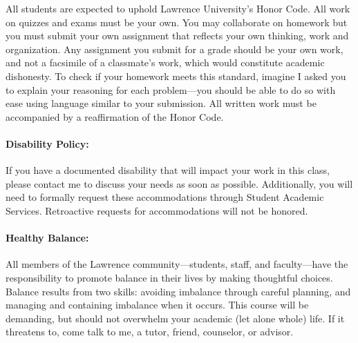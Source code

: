\documentclass[11pt,]{article}
\begin{document}
All students are expected to uphold Lawrence University's Honor Code.
All work on quizzes and exams must be your own. You may collaborate on
homework but you must submit your own assignment that reflects your own
thinking, work and organization. Any assignment you submit for a grade
should be your own work, and not a facsimile of a classmate's work,
which would constitute academic dishonesty. To check if your homework
meets this standard, imagine I asked you to explain your reasoning for
each problem---you should be able to do so with ease using language
similar to your submission. All written work must be accompanied by a
reaffirmation of the Honor Code.

\paragraph{Disability Policy:}\label{disability-policy}

If you have a documented disability that will impact your work in this
class, please contact me to discuss your needs as soon as possible.
Additionally, you will need to formally request these accommodations
through Student Academic Services. Retroactive requests for
accommodations will not be honored.

\paragraph{Healthy Balance:}\label{healthy-balance}

All members of the Lawrence community---students, staff, and
faculty---have the responsibility to promote balance in their lives by
making thoughtful choices. Balance results from two skills: avoiding
imbalance through careful planning, and managing and containing
imbalance when it occurs. This course will be demanding, but should not
overwhelm your academic (let alone whole) life. If it threatens to, come
talk to me, a tutor, friend, counselor, or advisor.
\end{document}

